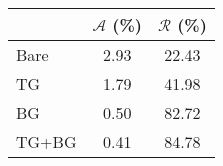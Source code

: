 \begin{tabular}{lSS}
\toprule
 & {$\mathcal{A}$ (\unit{\percent})} & {$\mathcal{R}$ (\unit{\percent})} \\
\midrule
Bare & 2.93 & 22.43 \\
TG & 1.79 & 41.98 \\
BG & 0.50 & 82.72 \\
TG+BG & 0.41 & 84.78 \\
\bottomrule
\end{tabular}

